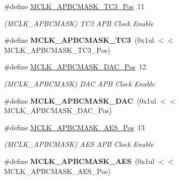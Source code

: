 \begin{DoxyCompactItemize}
\item 
\hypertarget{group___s_a_m_l21___m_c_l_k_ga1802cf9fe564bf6d91ed88729fb9ae78}{}\#define \hyperlink{group___s_a_m_l21___m_c_l_k_ga1802cf9fe564bf6d91ed88729fb9ae78}{M\+C\+L\+K\+\_\+\+A\+P\+B\+C\+M\+A\+S\+K\+\_\+\+T\+C3\+\_\+\+Pos}~11\label{group___s_a_m_l21___m_c_l_k_ga1802cf9fe564bf6d91ed88729fb9ae78}

\begin{DoxyCompactList}\small\item\em (M\+C\+L\+K\+\_\+\+A\+P\+B\+C\+M\+A\+S\+K) T\+C3 A\+P\+B Clock Enable \end{DoxyCompactList}\item 
\hypertarget{group___s_a_m_l21___m_c_l_k_gabf583e8c4680e3fd537f73e3aad520b5}{}\#define {\bfseries M\+C\+L\+K\+\_\+\+A\+P\+B\+C\+M\+A\+S\+K\+\_\+\+T\+C3}~(0x1ul $<$$<$ M\+C\+L\+K\+\_\+\+A\+P\+B\+C\+M\+A\+S\+K\+\_\+\+T\+C3\+\_\+\+Pos)\label{group___s_a_m_l21___m_c_l_k_gabf583e8c4680e3fd537f73e3aad520b5}

\item 
\hypertarget{group___s_a_m_l21___m_c_l_k_gabadc45c03b50f2e6ace929a858401219}{}\#define \hyperlink{group___s_a_m_l21___m_c_l_k_gabadc45c03b50f2e6ace929a858401219}{M\+C\+L\+K\+\_\+\+A\+P\+B\+C\+M\+A\+S\+K\+\_\+\+D\+A\+C\+\_\+\+Pos}~12\label{group___s_a_m_l21___m_c_l_k_gabadc45c03b50f2e6ace929a858401219}

\begin{DoxyCompactList}\small\item\em (M\+C\+L\+K\+\_\+\+A\+P\+B\+C\+M\+A\+S\+K) D\+A\+C A\+P\+B Clock Enable \end{DoxyCompactList}\item 
\hypertarget{group___s_a_m_l21___m_c_l_k_gaa21b35aa90994641cd5d7f356b1186f8}{}\#define {\bfseries M\+C\+L\+K\+\_\+\+A\+P\+B\+C\+M\+A\+S\+K\+\_\+\+D\+A\+C}~(0x1ul $<$$<$ M\+C\+L\+K\+\_\+\+A\+P\+B\+C\+M\+A\+S\+K\+\_\+\+D\+A\+C\+\_\+\+Pos)\label{group___s_a_m_l21___m_c_l_k_gaa21b35aa90994641cd5d7f356b1186f8}

\item 
\hypertarget{group___s_a_m_l21___m_c_l_k_gafe03bc583599946038f7e2de91be340c}{}\#define \hyperlink{group___s_a_m_l21___m_c_l_k_gafe03bc583599946038f7e2de91be340c}{M\+C\+L\+K\+\_\+\+A\+P\+B\+C\+M\+A\+S\+K\+\_\+\+A\+E\+S\+\_\+\+Pos}~13\label{group___s_a_m_l21___m_c_l_k_gafe03bc583599946038f7e2de91be340c}

\begin{DoxyCompactList}\small\item\em (M\+C\+L\+K\+\_\+\+A\+P\+B\+C\+M\+A\+S\+K) A\+E\+S A\+P\+B Clock Enable \end{DoxyCompactList}\item 
\hypertarget{group___s_a_m_l21___m_c_l_k_ga2ba4d5128ce2cd738d9019fa127815e0}{}\#define {\bfseries M\+C\+L\+K\+\_\+\+A\+P\+B\+C\+M\+A\+S\+K\+\_\+\+A\+E\+S}~(0x1ul $<$$<$ M\+C\+L\+K\+\_\+\+A\+P\+B\+C\+M\+A\+S\+K\+\_\+\+A\+E\+S\+\_\+\+Pos)\label{group___s_a_m_l21___m_c_l_k_ga2ba4d5128ce2cd738d9019fa127815e0}


\end{DoxyCompactItemize}
